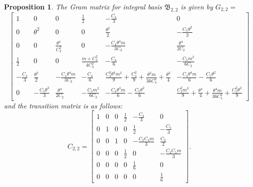 \documentclass[table]{amsart}
\newtheorem{proposition}[theorem]{Proposition}
\numberwithin{equation}{section}
\begin{document}
\begin{proposition}
    The Gram matrix for integral basis $\mathfrak{B}_{2,2}$ is given by $G_{2,2}=$
    \[
\begin{bmatrix}
1 & 0 & 0 & \tfrac{1}{2} & -\tfrac{C_4}{3} & 0 \\[8pt]

0 & \theta^2 & 0 & 0 & \tfrac{\theta^2}{2 } 
& -\tfrac{C_5 \theta^2}{3 } \\[8pt]

0 
& 0 
& \tfrac{\theta^4}{C_2^2} 
& 0 
& -\tfrac{ C_4 \theta^4 m}{3 C_2} 
& \tfrac{ \theta^4}{2 C_2} \\[8pt]

\tfrac{1}{2} 
& 0 
& 0 
& \tfrac{m+C_3^2}{4 C_3^2}
& -\tfrac{C_4}{6} 
& -\tfrac{ C_5 m^2}{6 C_3} \\[8pt]

-\tfrac{C_4}{3} 
& \tfrac{\theta^2}{2 } 
& -\tfrac{ C_4 \theta^4 m}{3 C_2} 
& -\tfrac{C_4}{6} 
& \tfrac{ C_4^2 \theta^4 m^2}{9 }
  + \tfrac{C_4^2}{9}
  + \tfrac{\theta^2 m}{36 C_4^2}
  + \tfrac{\theta^2}{4 } 
& -\tfrac{ C_4 \theta^4 m}{6 }
  - \tfrac{C_5 \theta^2}{6 } \\[8pt]

0 
& -\tfrac{C_5 \theta^2}{3 } 
& \tfrac{ \theta^4}{2 C_2} 
& -\tfrac{C_5 m^2}{6 C_3} 
& -\tfrac{ C_4 \theta^4 m}{6 }
  - \tfrac{C_5 \theta^2}{6 } 
& \tfrac{ C_5^2 m^3}{9}
  + \tfrac{ \theta^4}{4 }
  + \tfrac{\theta^4 m}{36 C_5^2}
  + \tfrac{C_5^2 \theta^2}{9 }
\end{bmatrix}
\]
 and the transition matrix is as follows:
\[
C_{2,2}=\begin{bmatrix}
1 & 0 & 0 & \tfrac{1}{2} & -\tfrac{C_4}{3} & 0 \\[8pt]
0 & 1 & 0 & 0 & \tfrac{1}{2} & -\tfrac{C_5}{3} \\[8pt]
0 & 0 & 1 & 0 & -\tfrac{C_2 C_4 m}{3} & \tfrac{C_2}{2} \\[8pt]
0 & 0 & 0 & \tfrac{1}{2} & 0 & -\tfrac{C_3 C_5 m}{3} \\[8pt]
0 & 0 & 0 & 0 & \tfrac{1}{6} & 0 \\[8pt]
0 & 0 & 0 & 0 & 0 & \tfrac{1}{6}
\end{bmatrix}.
\]
\end{proposition}
\end{document}
